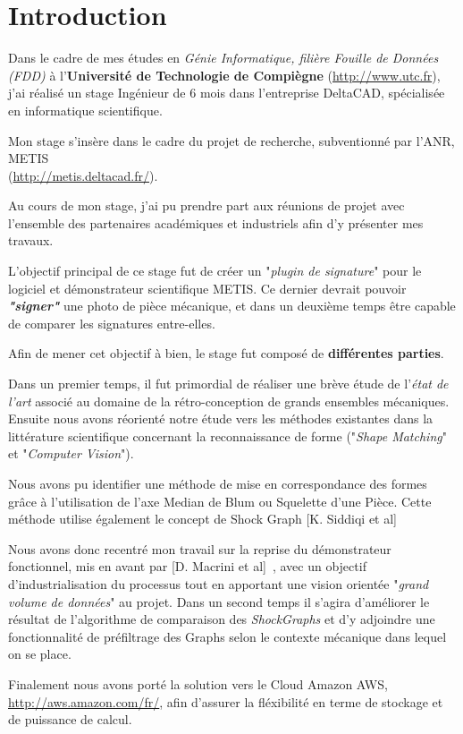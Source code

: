 \chapter*{Introduction}

Dans le cadre de mes études en \emph{Génie Informatique, filière Fouille de Données (FDD)} à l'\textbf{Université de Technologie de Compiègne} (\url{http://www.utc.fr}), j'ai réalisé un stage Ingénieur de 6 mois dans l'entreprise DeltaCAD, spécialisée en informatique scientifique. 


Mon stage s'insère dans le cadre du projet de recherche, subventionné par l'ANR, METIS \\(\url{http://metis.deltacad.fr/}).

Au cours de mon stage, j'ai pu prendre part aux réunions de projet avec l'ensemble des partenaires académiques et industriels afin d'y présenter mes travaux.

L'objectif principal de ce stage fut de créer un "\textit{plugin de signature}" pour le logiciel et démonstrateur scientifique METIS. Ce dernier devrait pouvoir \textit{\textbf{"signer"}} une photo de pièce mécanique, et dans un deuxième temps être capable de comparer les signatures entre-elles.

Afin de mener cet objectif à bien, le stage fut composé de \textbf{différentes parties}.

Dans un premier temps, il fut primordial de réaliser une brève étude de l'\textit{état de l'art} associé au domaine de la rétro-conception de grands ensembles mécaniques.
Ensuite nous avons réorienté notre étude vers les méthodes existantes dans la littérature scientifique concernant la reconnaissance de forme ("\textit{Shape Matching}" et "\textit{Computer Vision}").

Nous avons pu identifier une méthode de mise en correspondance des formes grâce à l'utilisation de l'axe Median de Blum ou Squelette d'une Pièce. Cette méthode utilise également le concept de Shock Graph [K. Siddiqi et al]~\cite{Siddiqi1999}

Nous avons donc recentré mon travail sur la reprise du démonstrateur fonctionnel, mis en avant par [D. Macrini et al]~\cite{Macrini2002}, avec un objectif d'industrialisation du processus tout en apportant une vision orientée "\textit{grand volume de données}" au projet.
Dans un second temps il s'agira d'améliorer le résultat de l'algorithme de comparaison des \textit{ShockGraphs} et d'y adjoindre une fonctionnalité de préfiltrage des Graphs selon le contexte mécanique dans lequel on se place.

Finalement nous avons porté la solution vers le Cloud Amazon AWS, \url{http://aws.amazon.com/fr/}, afin d'assurer la fléxibilité en terme de stockage et de puissance de calcul.

